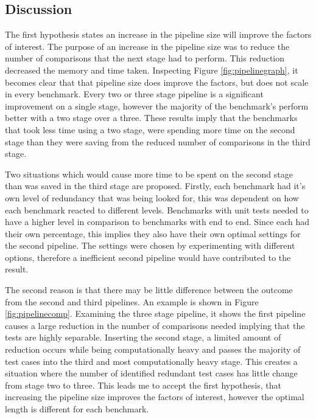 \subsection{Discussion}

The first hypothesis states an increase in the pipeline size will improve the factors of interest. The purpose of an increase in the pipeline size was to reduce the number of comparisons that the next stage had to perform. This reduction decreased the memory and time taken. Inspecting Figure \ref{fig:pipelinegraph}, it becomes clear that that pipeline size does improve the factors, but does not scale in every benchmark. Every two or three stage pipeline is a significant improvement on a single stage, however the majority of the benchmark's perform better with a two stage over a three. These results imply that the benchmarks that took less time using a two stage, were spending more time on the second stage than they were saving from the reduced number of comparisons in the third stage. 

Two situations which would cause more time to be spent on the second stage than was saved in the third stage are proposed. Firstly, each benchmark had it's own level of redundancy that was being looked for, this was dependent on how each benchmark reacted to different levels. Benchmarks with unit tests needed to have a higher level in comparison to benchmarks with end to end. Since each had their own percentage, this implies they also have their own optimal settings for the second pipeline. The settings were chosen by experimenting with different options, therefore a inefficient second pipeline would have contributed to the result.

The second reason is that there may be little difference between the outcome from the second and third pipelines. An example is shown in Figure \ref{fig:pipelinecomp}. Examining the three stage pipeline, it shows the first pipeline causes a large reduction in the number of comparisons needed implying that the tests are highly separable. Inserting the second stage, a limited amount of reduction occurs while being computationally heavy and passes the majority of test cases into the third and most computationally heavy stage.  This creates a situation where the number of identified redundant test cases has little change from stage two to three. This leads me to accept the first hypothesis, that increasing the pipeline size improves the factors of interest, however the optimal length is different for each benchmark.


